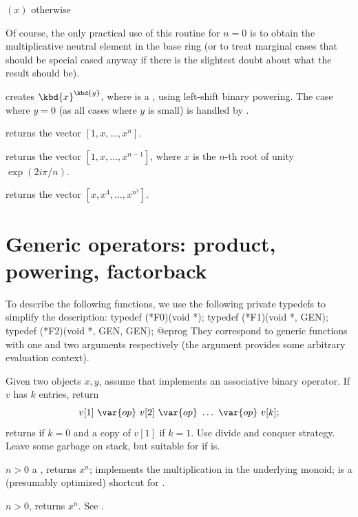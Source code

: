 \item {}$(x)$ otherwise

Of course, the only practical use of this routine for $n = 0$ is
to obtain the multiplicative neutral element in the base ring (or to treat
marginal cases that should be special cased anyway if there is the slightest
doubt about what the result should be).

 creates $\kbd{x}^{\kbd{y}}$, where  is a
, using left-shift binary powering. The case where $y = 0$
(as all cases where $y$ is small) is handled by .

 returns the vector $[1,x,\dots,x^n]$.

 returns the vector
$[1,x,\dots,x^{n-1}]$, where $x$ is the $n$-th root of unity $\exp(2i\pi/n)$.

 returns the vector $[x,x^4,\dots,x^{n^2}]$.

\section{Generic operators: product, powering, factorback}

To describe the following functions, we use the following private typedefs
to simplify the description:
\bprog
  typedef (*F0)(void *);
  typedef (*F1)(void *, GEN);
  typedef (*F2)(void *, GEN, GEN);
@eprog
\noindent They correspond to generic functions with one and two arguments
respectively (the  argument provides some arbitrary evaluation
context).

Given two objects $x,y$, assume that  implements an
associative binary operator. If $v$ has $k$ entries, return
$$v[1]~\var{op}~v[2]~\var{op}~\ldots ~\var{op}~v[k];$$
returns  if $k = 0$ and a copy of $v[1]$ if $k = 1$.
Use divide and conquer strategy. Leave some garbage on stack, but suitable for
 if  is.

 $n > 0$ a
, returns $x^n$;  implements the multiplication
in the underlying monoid;  is a (presumably optimized) shortcut for
.

 $n > 0$,
returns $x^n$. See .

